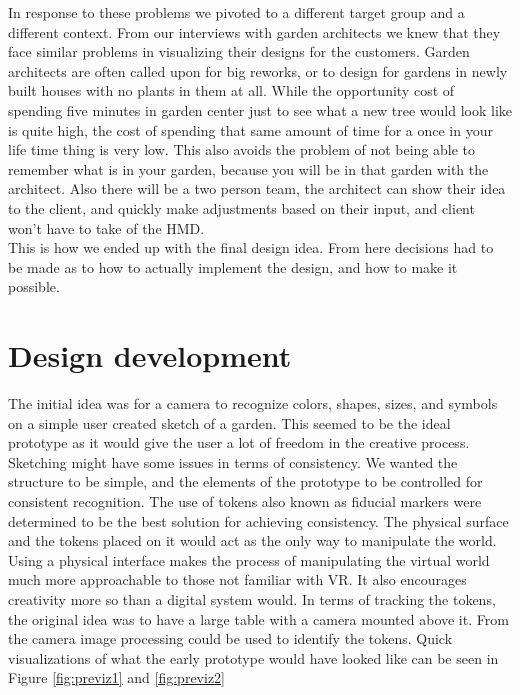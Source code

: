 In response to these problems we pivoted to a different target group and a different context. From our interviews with garden architects we knew that they face similar problems in visualizing their designs for the customers. Garden architects are often called upon for big reworks, or to design for gardens in newly built houses with no plants in them at all. While the opportunity cost of spending five minutes in garden center just to see what a new tree would look like is quite high, the cost of spending that same amount of time for a once in your life time thing is very low. This also avoids the problem of not being able to remember what is in your garden, because you will be in that garden with the architect. Also there will be a two person team, the architect can show their idea to the client, and quickly make adjustments based on their input, and client won't have to take of the HMD.\\
This is how we ended up with the final design idea. From here decisions had to be made as to how to actually implement the design, and how to make it possible.


\section{Design development}
The initial idea was for a camera to recognize colors, shapes, sizes, and symbols on a simple user created sketch of a garden. This seemed to be the ideal prototype as it would give the user a lot of freedom in the creative process. Sketching might have some issues in terms of consistency. We wanted the structure to be simple, and the elements of the prototype to be controlled for consistent recognition. The use of tokens also known as fiducial markers were determined to be the best solution for achieving consistency. The physical surface and the tokens placed on it would act as the only way to manipulate the world. Using a physical interface makes the process of manipulating the virtual world much more approachable to those not familiar with VR. It also encourages creativity more so than a digital system would. In terms of tracking the tokens, the original idea was to have a large table with a camera mounted above it. From the camera image processing could be used to identify the tokens. Quick visualizations of what the early prototype would have looked like can be seen in Figure \ref{fig:previz1} and \ref{fig:previz2}

